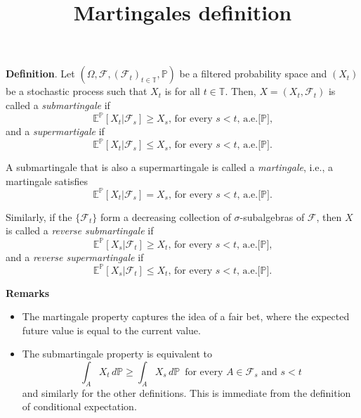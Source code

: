 \documentclass[12pt]{article}
\numberwithin{equation}{section}
\newcommand{\Prob}{\mathbb P}
\newcommand{\F}{\mathcal{F}}
\begin{document}
\title{Martingales definition}%

\textbf{Definition}.  Let $(\Omega, \F,(\F_t)_{t\in\mathbb{T}},\Prob)$ be a filtered probability space and $(X_t)$ be a stochastic process such that $X_t$ is  for all $t\in\mathbb{T}$. Then, $X=(X_t, \F_t)$ is called a \emph{submartingale} if
$$\mathbb{E}^{\Prob}[X_t|\F_s] \geq X_s,\, \mbox{for every $s < t$, a.e.[$\Prob$],}$$
and a \emph{supermartigale} if 
$$\mathbb{E}^{\Prob}[X_t|\F_s] \leq X_s,\, \mbox{for every $s < t$, a.e.[$\Prob$].}$$

\noindent A submartingale that is also a supermartingale is called a
\emph{martingale}, i.e., a martingale satisfies
$$\mathbb{E}^{\Prob}[X_t|\F_s] = X_s,\, \mbox{for
every $s < t$, a.e.[$\Prob$].}$$

\noindent Similarly, if the $\{\F_t\}$ form a decreasing collection of $\sigma$-subalgebras of $\F$, then $X$ is called a \emph{reverse submartingale} if 
$$\mathbb{E}^{\Prob}[X_s|\F_t] \geq X_t,\, \mbox{for every $s < t$, a.e.[$\Prob$],}$$
and a \emph{reverse supermartingale} if 
$$\mathbb{E}^{\Prob}[X_s|\F_t] \leq X_t,\, \mbox{for every $s < t$, a.e.[$\Prob$].}$$

\medskip

\textbf{Remarks}
\begin{itemize}
\item
The martingale property captures the idea of a fair bet, where the
expected future value is equal to the current value.
\item
The submartingale property is equivalent to $$\int_A X_t \, d\Prob \geq
\int_A X_s \, d\Prob \,\,\, \mbox{for every $A \in \F_s$ and $s <
t$}$$ and similarly for the other definitions. This is immediate
from the definition of conditional expectation.
\end{itemize}


\end{document}
